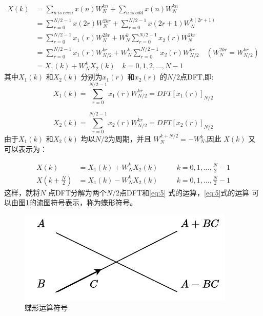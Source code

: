 \begin{equation}
    \begin{aligned}
    \label{eq:1}
        X(k)&= \sum_{n~is~even} x(n)W_N^{kn}+\sum_{n~is~odd}x(n)W_N^{kn}\\
            &= \sum_{r=0}^{N /2 -1}x(2r)W_N^{2kr}+\sum_{r=0}^{N /2-1} x(2r+1)W_{N}^{k(2r+1)}\\
            &= \sum_{r=0}^{N/2-1}x_1(r)W_N^{2kr}+W_N^k\sum_{r=0}^{N/2-1}x_2(r)W_N^{2kr}\\
            &= \sum_{r=0}^{N/2-1}x_1(r)W_{N /2}^{kr}+W_N^k\sum_{r=0}^{N/2-1}x_2(r)W_{N /2}^{kr}\quad (W_N^{2kr}=W_{N/2}^{kr})\\
            &=X_1(k)+W_{N}^kX_2(k)\quad k=0,1,2,\dots,N-1
    \end{aligned}
\end{equation}
其中$X_1(k)$ 和$X_2(k)$ 分别为$x_1(r)$ 和$x_2(r)$ 的$N /2$点DFT,即:
\begin{equation}\label{eq:3}
     X_1(k)=\sum_{r=0}^{N /2-1} x_1(r)W_{N/2}^{kr}=DFT[x_1(r)]_{N /2}
\end{equation}

\begin{equation}\label{eq:4}
     X_2(k)=\sum_{r=0}^{N /2-1} x_2(r)W_{N/2}^{kr}=DFT[x_2(r)]_{N /2}
\end{equation}
由于$X_1(k)$ 和$X_2(k)$ 均以$N /2$为周期，并且 $W_N^{k+ N /2}=-W_N^k$,因此 $X(k)$ 又
可以表示为：

\begin{equation}
    \begin{aligned}
        \label{eq:5}
        X(k)&=X_1(k)+W_N^kX_2(k)&\quad & k=0,1,\dots,\frac{N}{2}-1\\
        X(k+\frac{N}{2})&=X_1(k)-W_N^kX_2(k)&\quad & k=0,1,\dots,\frac{N}{2}-1
    \end{aligned}
\end{equation}
这样，就将$N$ 点DFT分解为两个$N /2$点DFT和\ref{eq:5} 式的运算，\ref{eq:5}式的运算
可以由图\ref{fig:buttery}的流图符号表示，称为蝶形符号。
\begin{figure}[htpb]
        \centering
            \includegraphics[width=0.4\linewidth]{Figure/butteryfly.pdf}
\caption{蝶形运算符号}%
\label{fig:buttery}
\end{figure}

